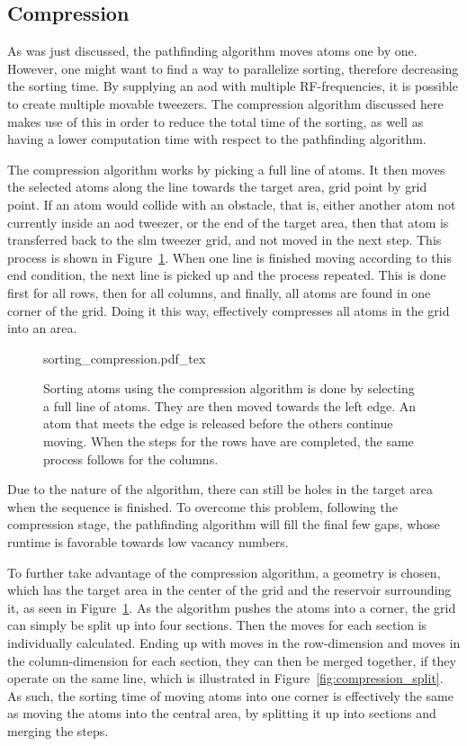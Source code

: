 \subsection{Compression}%
\label{sec:compression}

As was just discussed, the pathfinding algorithm moves atoms one by one. However, one might want to find a way to parallelize sorting, therefore decreasing the sorting time. By supplying an \ac{aod} with multiple RF-frequencies, it is possible to create multiple movable tweezers. The compression algorithm discussed here makes use of this in order to reduce the total time of the sorting, as well as having a lower computation time with respect to the pathfinding algorithm.

The compression algorithm works by picking a full line of atoms. It then moves the selected atoms along the line towards the target area, grid point by grid point. If an atom would collide with an obstacle, that is, either another atom not currently inside an \ac{aod} tweezer, or the end of the target area, then that atom is transferred back to the \ac{slm} tweezer grid, and not moved in the next step. This process is shown in Figure~\ref{fig:sorting_compression}. When one line is finished moving according to this end condition, the next line is picked up and the process repeated. This is done first for all rows, then for all columns, and finally, all atoms are found in one corner of the grid. Doing it this way, effectively compresses all atoms in the grid into an area.

\begin{figure}[tbp]%
\centering
{sorting_compression.pdf_tex}
\caption{Sorting atoms using the compression algorithm is done by selecting a full line of atoms. They are then moved towards the left edge. An atom that meets the edge is released before the others continue moving. When the steps for the rows have are completed, the same process follows for the columns.}%
\label{fig:sorting_compression}
\end{figure}

Due to the nature of the algorithm, there can still be holes in the target area when the sequence is finished. To overcome this problem, following the compression stage, the pathfinding algorithm will fill the final few gaps, whose runtime is favorable towards low vacancy numbers.

To further take advantage of the compression algorithm, a geometry is chosen, which has the target area in the center of the grid and the reservoir surrounding it, as seen in Figure~\ref{fig:sorting_compression}. As the algorithm pushes the atoms into a corner, the grid can simply be split up into four sections. Then the moves for each section is individually calculated. Ending up with moves in the row-dimension and moves in the column-dimension for each section, they can then be merged together, if they operate on the same line, which is illustrated in Figure~\ref{fig:compression_split}. As such, the sorting time of moving atoms into one corner is effectively the same as moving the atoms into the central area, by splitting it up into sections and merging the steps.

